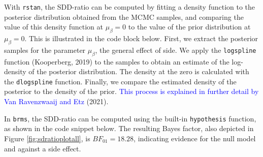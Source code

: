 \documentclass[
  english,
  doc,floatsintext]{apa6}
\newenvironment{Shaded}{\begin{snugshade}}{\end{snugshade}}
\newcommand{\CommentTok}[1]{\textcolor[rgb]{0.56,0.35,0.01}{\textit{#1}}}
\newcommand{\DecValTok}[1]{\textcolor[rgb]{0.00,0.00,0.81}{#1}}
\newcommand{\FloatTok}[1]{\textcolor[rgb]{0.00,0.00,0.81}{#1}}
\newcommand{\FunctionTok}[1]{\textcolor[rgb]{0.00,0.00,0.00}{#1}}
\newcommand{\NormalTok}[1]{#1}
\newcommand{\OtherTok}[1]{\textcolor[rgb]{0.56,0.35,0.01}{#1}}
\newcommand{\SpecialCharTok}[1]{\textcolor[rgb]{0.00,0.00,0.00}{#1}}
\begin{document}
With \texttt{rstan}, the SDD-ratio can be computed by fitting a density function to the posterior distribution obtained from the MCMC samples, and comparing the value of this density function at \(\mu_{\beta} = 0\) to the value of the prior distribution at \(\mu_{\beta} = 0\). This is illustrated in the code block below. First, we extract the posterior samples for the parameter \(\mu_{\beta}\), the general effect of side. We apply the \texttt{logspline} function (Kooperberg, 2019) to the samples to obtain an estimate of the log-density of the posterior distribution. The density at the zero is calculated with the \texttt{dlogspline} function. Finally, we compare the estimated density of the posterior to the density of the prior. \textcolor{blue}{This process is explained in further detail by Van Ravenzwaaij and Etz} (2021).

\scriptsize

\begin{Shaded}
\end{Shaded}

\normalsize

In \texttt{brms}, the SDD-ratio can be computed using the built-in \texttt{hypothesis} function, as shown in the code snippet below. The resulting Bayes factor, also depicted in Figure \ref{fig:sdratioplotall}, is \(BF_{01} = 18.28\), indicating evidence for the null model and against a side effect.
~
\end{document}
